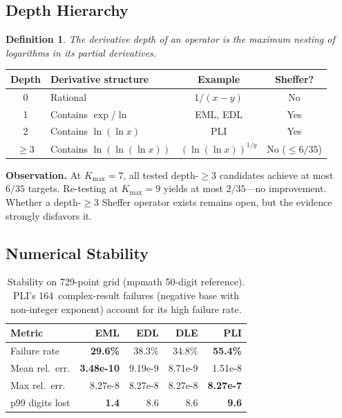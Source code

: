 \documentclass[10pt,twocolumn]{article}
\newtheorem{definition}{Definition}
\theoremstyle{remark}
\begin{document}
\subsection{Depth Hierarchy}

\begin{definition}\label{def:depth}
The \emph{derivative depth} of an operator is the maximum nesting of logarithms in its partial derivatives.
\end{definition}

\begin{center}
\small
\begin{tabular}{clcc}
\toprule
Depth & Derivative structure & Example & Sheffer?\\
\midrule
0 & Rational & $1/(x-y)$ & No\\
1 & Contains $\exp$/$\ln$ & EML, EDL & Yes\\
2 & Contains $\ln(\ln x)$ & PLI & Yes\\
$\geq 3$ & Contains $\ln(\ln(\ln x))$ & $(\ln(\ln x))^{1/y}$ & No ($\leq 6/35$)\\
\bottomrule
\end{tabular}
\end{center}

\noindent\textbf{Observation.} At $K_{\max} = 7$, all tested depth-$\geq 3$ candidates achieve at most $6/35$ targets. Re-testing at $K_{\max} = 9$ yields at most $2/35$---no improvement. Whether a depth-$\geq 3$ Sheffer operator exists remains open, but the evidence strongly disfavors it.

\subsection{Numerical Stability}

\begin{table}[h]
\centering
\small
\begin{tabular}{lrrrr}
\toprule
Metric & EML & EDL & DLE & PLI\\
\midrule
Failure rate & \textbf{29.6\%} & 38.3\% & 34.8\% & \textbf{55.4\%}\\
Mean rel.\ err. & \textbf{3.48e-10} & 9.19e-9 & 8.71e-9 & 1.51e-8\\
Max rel.\ err. & 8.27e-8 & 8.27e-8 & 8.27e-8 & \textbf{8.27e-7}\\
p99 digits lost & \textbf{1.4} & 8.6 & 8.6 & \textbf{9.6}\\
\bottomrule
\end{tabular}
\caption{Stability on 729-point grid (mpmath 50-digit reference). PLI's 164~complex-result failures (negative base with non-integer exponent) account for its high failure rate.}
\end{table}
\end{document}
